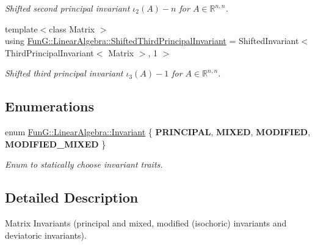 \begin{DoxyCompactItemize}
\begin{DoxyCompactList}\small\item\em Shifted second principal invariant $ \iota_2(A) - n $ for $ A\in\mathbb{R}^{n,n} $. \end{DoxyCompactList}\item 
\hypertarget{group__InvariantGroup_ga8d0abdb226de4420bfecf43569b19c3e}{{\footnotesize template$<$class Matrix $>$ }\\using \hyperlink{group__InvariantGroup_ga8d0abdb226de4420bfecf43569b19c3e}{Fun\-G\-::\-Linear\-Algebra\-::\-Shifted\-Third\-Principal\-Invariant} = Shifted\-Invariant$<$ Third\-Principal\-Invariant$<$ Matrix $>$, 1 $>$}\label{group__InvariantGroup_ga8d0abdb226de4420bfecf43569b19c3e}

\begin{DoxyCompactList}\small\item\em Shifted third principal invariant $ \iota_3(A) - 1 $ for $ A\in\mathbb{R}^{n,n} $. \end{DoxyCompactList}\end{DoxyCompactItemize}
\subsection*{Enumerations}
\begin{DoxyCompactItemize}
\item 
enum \hyperlink{group__InvariantGroup_gadfa77af4ecda1d90e7ebc3b5bf56bce8}{Fun\-G\-::\-Linear\-Algebra\-::\-Invariant} \{ {\bfseries P\-R\-I\-N\-C\-I\-P\-A\-L}, 
{\bfseries M\-I\-X\-E\-D}, 
{\bfseries M\-O\-D\-I\-F\-I\-E\-D}, 
{\bfseries M\-O\-D\-I\-F\-I\-E\-D\-\_\-\-M\-I\-X\-E\-D}
 \}
\begin{DoxyCompactList}\small\item\em Enum to statically choose invariant traits. \end{DoxyCompactList}\end{DoxyCompactItemize}


\subsection{Detailed Description}
Matrix Invariants (principal and mixed, modified (isochoric) invariants and deviatoric invariants). 
